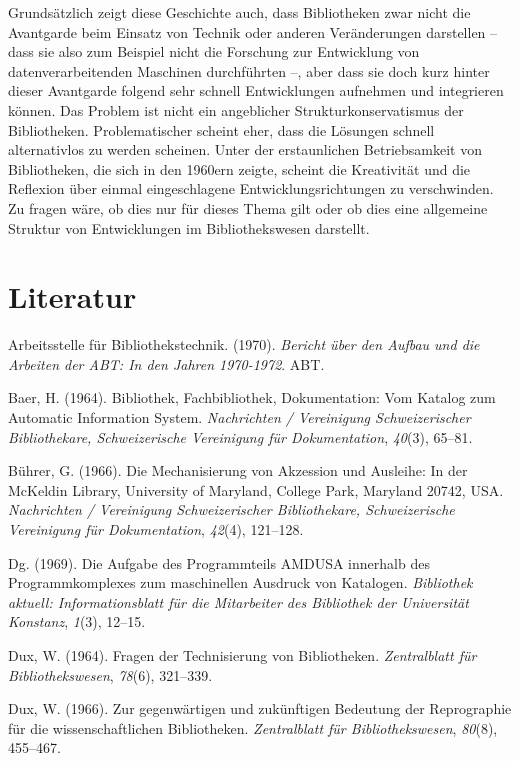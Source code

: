 \documentclass[a4paper,
fontsize=11pt,
oneside,
numbers=noperiodatend,
parskip=half-,
bibliography=totoc,
final
]{scrartcl}
\begin{document}
Grundsätzlich zeigt diese Geschichte auch, dass Bibliotheken zwar nicht
die Avantgarde beim Einsatz von Technik oder anderen Veränderungen
darstellen -- dass sie also zum Beispiel nicht die Forschung zur
Entwicklung von datenverarbeitenden Maschinen durchführten --, aber dass
sie doch kurz hinter dieser Avantgarde folgend sehr schnell
Entwicklungen aufnehmen und integrieren können. Das Problem ist nicht
ein angeblicher Strukturkonservatismus der Bibliotheken. Problematischer
scheint eher, dass die Lösungen schnell alternativlos zu werden
scheinen. Unter der erstaunlichen Betriebsamkeit von Bibliotheken, die
sich in den 1960ern zeigte, scheint die Kreativität und die Reflexion
über einmal eingeschlagene Entwicklungsrichtungen zu verschwinden. Zu
fragen wäre, ob dies nur für dieses Thema gilt oder ob dies eine
allgemeine Struktur von Entwicklungen im Bibliothekswesen darstellt.

\hypertarget{literatur}{%
\section{Literatur}\label{literatur}}

Arbeitsstelle für Bibliothekstechnik. (1970). \emph{Bericht über den
Aufbau und die Arbeiten der ABT: In den Jahren 1970-1972}. ABT.

Baer, H. (1964). Bibliothek, Fachbibliothek, Dokumentation: Vom Katalog
zum Automatic Information System. \emph{Nachrichten / Vereinigung
Schweizerischer Bibliothekare, Schweizerische Vereinigung für
Dokumentation}, \emph{40}(3), 65--81.

Bührer, G. (1966). Die Mechanisierung von Akzession und Ausleihe: In der
McKeldin Library, University of Maryland, College Park, Maryland 20742,
USA. \emph{Nachrichten / Vereinigung Schweizerischer Bibliothekare,
Schweizerische Vereinigung für Dokumentation}, \emph{42}(4), 121--128.

Dg. (1969). Die Aufgabe des Programmteils AMDUSA innerhalb des
Programmkomplexes zum maschinellen Ausdruck von Katalogen.
\emph{Bibliothek aktuell: Informationsblatt für die Mitarbeiter des
Bibliothek der Universität Konstanz}, \emph{1}(3), 12--15.

Dux, W. (1964). Fragen der Technisierung von Bibliotheken.
\emph{Zentralblatt für Bibliothekswesen}, \emph{78}(6), 321--339.

Dux, W. (1966). Zur gegenwärtigen und zukünftigen Bedeutung der
Reprographie für die wissenschaftlichen Bibliotheken. \emph{Zentralblatt
für Bibliothekswesen}, \emph{80}(8), 455--467.
\end{document}

